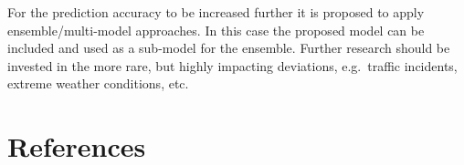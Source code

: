 ﻿\documentclass[preprint,11pt,5p,twocolumn]{elsarticle}
\begin{document}
For the prediction accuracy to be increased further it is proposed to apply ensemble/multi-model approaches. In this case the proposed model can be included and used as a sub-model for the ensemble. Further research should be invested in the more rare, but highly impacting deviations, e.g.\ traffic incidents, extreme weather conditions, etc.

\section*{References}

%

\end{document}
